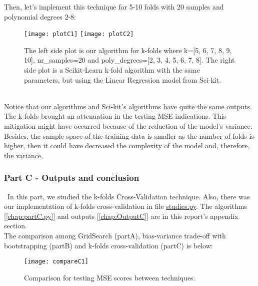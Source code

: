 Then, let's implement this technique for 5-10 folds with 20 samples and polynomial degrees 2-8: \\

\begin{figure}[h]
\label{fig:plotC1-2}
\texttt{[image: plotC1]}
\texttt{[image: plotC2]}
\caption{The left side plot is our algorithm for k-folds where k=[5, 6, 7, 8, 9, 10], nr\_samples=20 and poly\_degrees=[2, 3, 4, 5, 6, 7, 8]. The right side plot is a Scikit-Learn k-fold algorithm with the same parameters, but using the Linear Regression model from Sci-kit.}
\centering
\end{figure}\\

Notice that our algorithms and Sci-kit's algorithms have quite the same outputs. \\

The k-folds brought an attenuation in the testing MSE indications. This mitigation might have occurred because of the reduction of the model's variance. Besides, the sample space of the training data is smaller as the number of folds is higher, then it could have decreased the complexity of the model and, therefore, the variance. \\

\subsubsection{Part C - Outputs and conclusion}
\label{chap:Part C - Outputs and conclusion}

\quad \, In this part, we studied the k-folds Cross-Validation technique. Also, there was our implementation of k-folds cross-validation in file \href{https://github.com/fabiorodp/UiO-FYS-STK4155/blob/master/Project1/package/studies.py}{studies.py}. The algorithms [\autoref{chap:partC.py}] and outputs [\autoref{chap:OutputC}] are in this report's appendix section. \\

The comparison among GridSearch (partA), bias-variance trade-off with bootstrapping (partB) and k-folds cross-validation (partC) is below: \\

\begin{figure}[H]
\label{fig:compareC1}
\texttt{[image: compareC1]}
\caption{Comparison for testing MSE scores between techniques.}
\centering
\end{figure}\\


